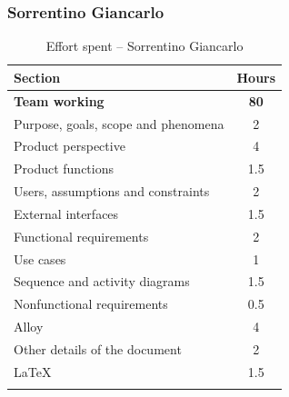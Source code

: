 \documentclass[a4paper,oneside,11pt]{book}   %
\begin{document}
    \subsubsection{Sorrentino Giancarlo}
    \begin{longtable}[c]{|H{.55\textwidth}|c|}
        \hline
        \textbf{Section} & {\bfseries{Hours}} \\ \hline
        \textbf{Team working} & \textbf{80} \\ \hline
        Purpose, goals, scope and phenomena & 2 \\ \hline
        Product perspective & 4 \\ \hline
        Product functions & 1.5 \\ \hline
        Users, assumptions and constraints & 2 \\ \hline
        External interfaces & 1.5 \\ \hline
        Functional requirements & 2 \\ \hline
        Use cases & 1 \\ \hline
        Sequence and activity diagrams & 1.5 \\ \hline
        Nonfunctional requirements & 0.5 \\ \hline
        Alloy & 4 \\ \hline
        Other details of the document & 2 \\ \hline
        \LaTeX & 1.5 \\
        \hline
        \caption{Effort spent -- Sorrentino Giancarlo}
        \label{table:effort_sorrentino}
    \end{longtable}
    
    \newpage
\end{document}
